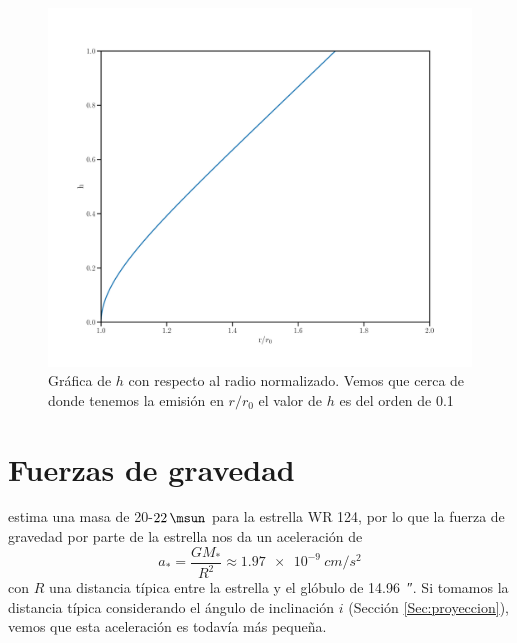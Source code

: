 \documentclass{book}
\begin{document}
\begin{figure}
    \centering
    \includegraphics[width=\textwidth]{imagenes_corregidas/h.pdf}
    \caption{Gráfica de $h$ con respecto al radio normalizado. Vemos que cerca de donde tenemos la emisión en $r/r_0$ el valor de $h$ es del orden de 0.1}
    \label{fig:h}
\end{figure}

\section{Fuerzas de gravedad} \label{F gravedad}

\cite{Hamann:2019} estima una masa de 20-$\SI{22}{\msun}$ para la
estrella WR 124, por lo que la fuerza de gravedad por parte de la
estrella nos da un aceleración de
\begin{equation}
a_*=\frac{GM_*}{R^2}\approx \SI{1.97e-9}{cm/s^2}
\end{equation}
con $R$ una distancia típica entre la estrella y el glóbulo de
\SI{14.96}{\arcsecond}. Si tomamos la distancia típica considerando el
ángulo de inclinación $i$ (Sección \ref{Sec:proyeccion}), vemos que
esta aceleración es todavía más pequeña.
\end{document}
